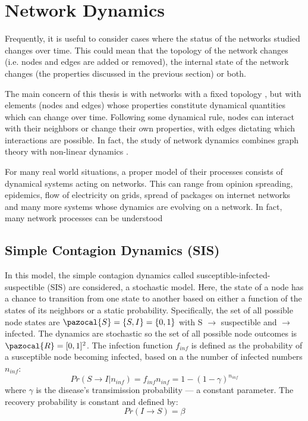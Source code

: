 \clearpage
\section{Network Dynamics}

Frequently, it is useful to consider cases where the status of the
networks studied changes over time. This could mean that the topology
of the network changes (i.e. nodes and edges are added or removed),
the internal state of the network changes (the properties discussed in
the previous section) or both. 

The main concern of this thesis is with networks with a fixed topology
, but with elements (nodes and edges) whose properties constitute
dynamical quantities which can change over time. Following some dynamical
rule, nodes can interact with their neighbors or change their own
properties, with edges dictating which interactions are possible.
In fact, the study of network dynamics combines graph theory with
non-linear dynamics \cite{book:Jost2007}.

For many real world situations, a proper model of their processes
consists of dynamical systems acting on networks. This can range
from opinion spreading, epidemics, flow of electricity on grids,
spread of packages on internet networks and many more systems
whose dynamics are evolving on a network. In fact, many network
processes can be understood 

\subsection{Simple Contagion Dynamics (SIS)}\label{sec:SIS}

In this model, the simple contagion dynamics called
susceptible-infected-suspectible (SIS) are considered, a stochastic
model. Here, the state of a node has a chance to transition from one
state to another based on either a function of the states of its
neighbors or a static probability. Specifically, the set of all
possible node states are $\pazocal{S} = \{S, I\} = \{0, 1\}$ with S $\rightarrow$
suspectible and $\rightarrow$ infected. The dynamics are stochastic
so the set of all possible node outcomes is $\pazocal{R} = [0, 1]^2$.
The infection function $f_{inf}$ is defined as the probability of a
susceptible node becoming infected, based on a the number of infected
numbers $n_{inf}$:
\begin{equation}
  \label{eq:prob_inf}
  Pr(S \rightarrow I|n_{inf}) = f_{inf}{n_{inf}} = 1 - (1 - \gamma)^{n_{inf}}
\end{equation}
where $\gamma$ is the disease's transimission probability --- a constant
parameter.
The recovery probability is constant and defined by:
\begin{equation}
  \label{eq:prob_rec}
  Pr(I \rightarrow S) = \beta
\end{equation}

